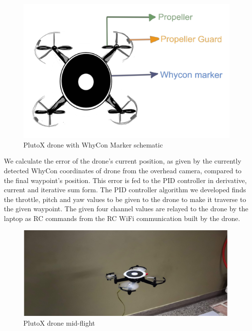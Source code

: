 \begin{figure}[H]
    \centering
    \includegraphics[scale=0.6]{SummerInterReport/project/Images-Major/WhyCon_plutox.png}
    \caption{PlutoX drone with WhyCon Marker schematic}
    \label{fig:plutox_WhyCon}
\end{figure}
We calculate the error of the drone's current position, as given by the currently detected WhyCon coordinates of drone from the overhead camera, compared to the final waypoint's position. This error is fed to the PID controller in derivative, current and iterative sum form. The PID controller algorithm we developed finds the throttle, pitch and yaw values to be given to the drone to make it traverse to the given waypoint. The given four channel values are relayed to the drone by the laptop as RC commands from the RC WiFi communication built by the drone.
\\
\begin{figure}[H]
    \centering
    \includegraphics[]{SummerInterReport/project/Images-Major/Flying_pluto.png}
    \caption{PlutoX drone mid-flight}
    \label{fig:plutox_flying}
\end{figure}


